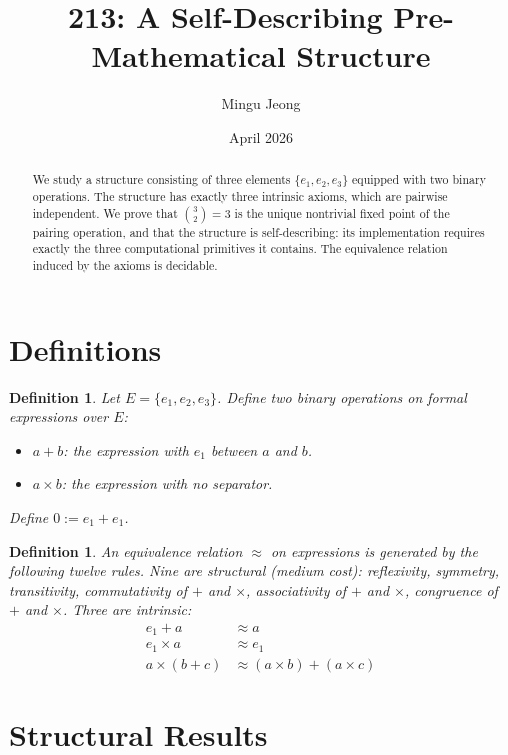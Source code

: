 \documentclass[12pt]{article}
\title{213: A Self-Describing Pre-Mathematical Structure}
\author{Mingu Jeong}
\date{April 2026}
\newtheorem{definition}[theorem]{Definition}
\begin{document}
\maketitle

\begin{abstract}
We study a structure consisting of three elements
$\{e_1, e_2, e_3\}$ equipped with two binary operations.
The structure has exactly three intrinsic axioms,
which are pairwise independent.
We prove that $\binom{3}{2} = 3$ is the unique
nontrivial fixed point of the pairing operation,
and that the structure is self-describing:
its implementation requires exactly the three
computational primitives it contains.
The equivalence relation induced by the axioms
is decidable.
\end{abstract}

\section{Definitions}

\begin{definition}
Let $E = \{e_1, e_2, e_3\}$.
Define two binary operations on formal expressions
over $E$:
\begin{itemize}
\item $a + b$: the expression with $e_1$ between $a$ and $b$.
\item $a \times b$: the expression with no separator.
\end{itemize}
Define $0 := e_1 + e_1$.
\end{definition}

\begin{definition}
An equivalence relation $\approx$ on expressions
is generated by the following twelve rules.
Nine are structural (medium cost):
reflexivity, symmetry, transitivity,
commutativity of $+$ and $\times$,
associativity of $+$ and $\times$,
congruence of $+$ and $\times$.
Three are intrinsic:
\begin{align}
e_1 + a &\approx a \tag{A8} \\
e_1 \times a &\approx e_1 \tag{A9} \\
a \times (b + c) &\approx
  (a \times b) + (a \times c) \tag{A12}
\end{align}
\end{definition}

\section{Structural Results}
\end{document}
